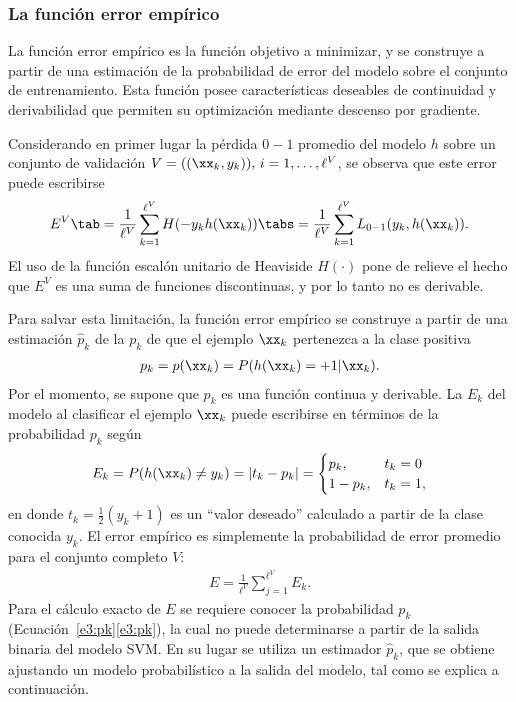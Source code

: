%
\subsubsection{La función error empírico}
%
La función error empírico es la función objetivo a minimizar, y se
construye a partir de una estimación de la probabilidad de error del
modelo sobre el conjunto de entrenamiento.
Esta función posee características deseables de continuidad y
derivabilidad que permiten su optimización mediante descenso por
gradiente.

Considerando en primer lugar la pérdida $0-1$ promedio del modelo $h$
sobre un conjunto de validación $V=((\xx_k,y_k)),\,i=1,\ldots,\ell^V$,
se observa que este error puede escribirse
%
\begin{align}
\label{e3:error-test-alt}
E^V \tab = \frac{1}{\ell^V}\sum_{k=1}^{\ell^V} H(-{y}_k {h}(\xx_k))
\tabs = \frac{1}{\ell^V}\sum_{k=1}^{\ell^V} L_{0-1}(y_k,h(\xx_k)).
\end{align}
%
El uso de la función escalón unitario de Heaviside $H(\cdot)$ pone de
relieve el hecho que $E^V$ es una suma de funciones discontinuas, y
por lo tanto no es derivable.

Para salvar esta limitación, la función error empírico se construye a
partir de una estimación $\hat{p}_k$ de la  $p_k$ de que el ejemplo $\xx_k$ pertenezca a la clase
positiva
%
\begin{align}
  \label{e3:pk}
  p_k = p(\xx_k) = P(h(\xx_k)=+1|\xx_k).
\end{align}
%
Por el momento, se supone que $p_k$ es una función continua y
derivable.
La  $E_k$ del modelo al clasificar el ejemplo
$\xx_k$ puede escribirse en términos de la probabilidad $p_k$ según
%
\begin{align}
\label{e3:Ek}
  E_k = P(h(\xx_k)\neq y_k) = |t_k-{p}_k| =
  \begin{cases}
    {p}_k, & t_k=0\\ 1-{p}_k, & t_k = 1,
  \end{cases}
\end{align}
%
en donde $t_k=\frac{1}{2}({y_k+1})$ es un ``valor deseado'' calculado
a partir de la clase conocida $y_k$.
El error empírico es simplemente la probabilidad de error promedio
para el conjunto completo $V$:
%
\begin{align}
\label{Err1}
  E = \frac{1}{\ell^V}\sum_{j=1}^{\ell^V} E_k.
\end{align}
%
Para el cálculo exacto de $E$ se requiere conocer la probabilidad
$p_k$ (\iflatexml{}Ecuación~\ref{e3:pk}\else\autoref{e3:pk}\fi), la
cual no puede determinarse a partir de la salida binaria del modelo
SVM.
En su lugar se utiliza un estimador $\hat{p}_k$, que se obtiene
ajustando un modelo probabilístico a la salida del modelo, tal como se
explica a continuación.
